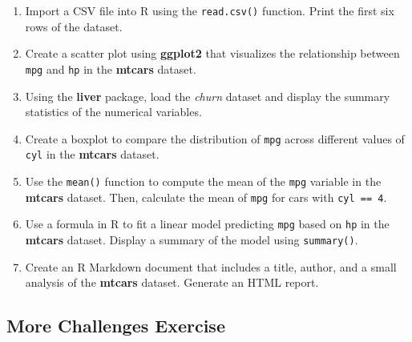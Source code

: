 \documentclass[
]{book}
\newcommand{\passthrough}[1]{#1}
\providecommand{\tightlist}{%
  \setlength{\itemsep}{0pt}\setlength{\parskip}{0pt}}
\theoremstyle{definition}
\theoremstyle{definition}
\theoremstyle{definition}
\theoremstyle{definition}
\theoremstyle{remark}
\begin{document}
\begin{enumerate}
\def\labelenumi{\arabic{enumi}.}
\setcounter{enumi}{10}
\tightlist
\item
  Import a CSV file into R using the \passthrough{\lstinline!read.csv()!} function. Print the first six rows of the dataset.\\
\item
  Create a scatter plot using \textbf{ggplot2} that visualizes the relationship between \passthrough{\lstinline!mpg!} and \passthrough{\lstinline!hp!} in the \textbf{mtcars} dataset.\\
\item
  Using the \textbf{liver} package, load the \emph{churn} dataset and display the summary statistics of the numerical variables.\\
\item
  Create a boxplot to compare the distribution of \passthrough{\lstinline!mpg!} across different values of \passthrough{\lstinline!cyl!} in the \textbf{mtcars} dataset.\\
\item
  Use the \passthrough{\lstinline!mean()!} function to compute the mean of the \passthrough{\lstinline!mpg!} variable in the \textbf{mtcars} dataset. Then, calculate the mean of \passthrough{\lstinline!mpg!} for cars with \passthrough{\lstinline!cyl == 4!}.\\
\item
  Use a formula in R to fit a linear model predicting \passthrough{\lstinline!mpg!} based on \passthrough{\lstinline!hp!} in the \textbf{mtcars} dataset. Display a summary of the model using \passthrough{\lstinline!summary()!}.\\
\item
  Create an R Markdown document that includes a title, author, and a small analysis of the \textbf{mtcars} dataset. Generate an HTML report.
\end{enumerate}

\subsection*{More Challenges Exercise}\label{more-challenges-exercise}
\end{document}
